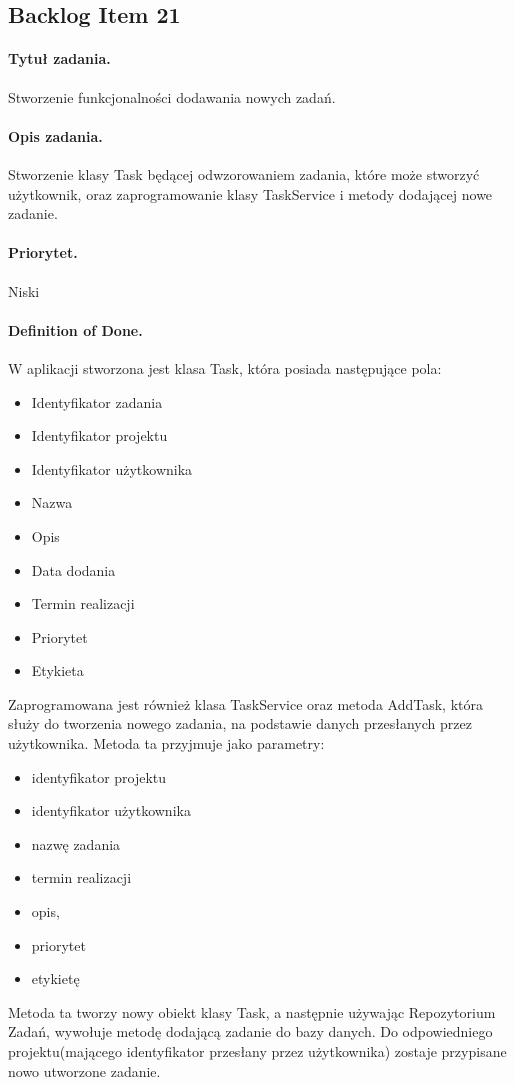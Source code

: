 ﻿\documentclass[a4paper]{article}
\begin{document}
\subsection{Backlog Item 21} 
\paragraph{Tytuł zadania.}  Stworzenie funkcjonalności dodawania nowych zadań.
\paragraph{Opis zadania.} Stworzenie klasy Task będącej odwzorowaniem zadania, które może stworzyć użytkownik, oraz zaprogramowanie klasy TaskService i metody dodającej nowe zadanie.
\paragraph{Priorytet.} Niski
\paragraph{Definition of Done.} W aplikacji stworzona jest klasa Task, która posiada następujące pola:
\begin{itemize}
\item Identyfikator zadania
\item Identyfikator projektu
\item Identyfikator użytkownika
\item Nazwa
\item Opis
\item Data dodania
\item Termin realizacji
\item Priorytet
\item Etykieta
\end{itemize}
Zaprogramowana jest również klasa TaskService oraz metoda AddTask, która służy do tworzenia nowego zadania, na podstawie danych przesłanych przez użytkownika. Metoda ta przyjmuje jako parametry:
\begin{itemize}
\item identyfikator projektu
\item identyfikator użytkownika
\item nazwę zadania
\item termin realizacji
\item opis, 
\item priorytet
\item etykietę
\end{itemize}
Metoda ta tworzy nowy obiekt klasy Task, a następnie używając Repozytorium Zadań, wywołuje metodę dodającą zadanie do bazy danych. Do odpowiedniego projektu(mającego identyfikator przesłany przez użytkownika) zostaje przypisane nowo utworzone zadanie.
\end{document}
